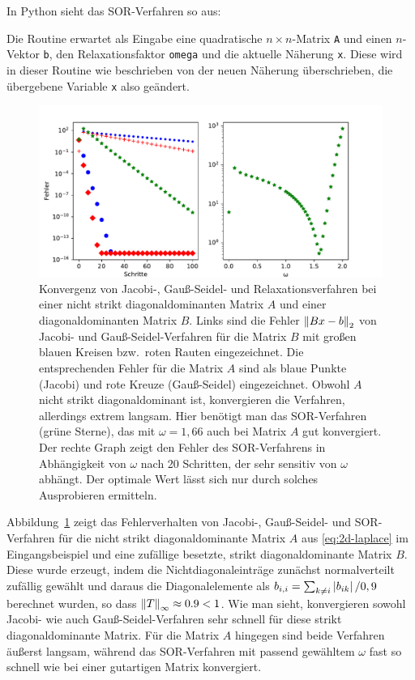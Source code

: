 In Python sieht das SOR-Verfahren so aus:

Die Routine erwartet als Eingabe eine quadratische $n\times n$-Matrix
\lstinline!A! und einen $n$-Vektor \lstinline!b!, den
Relaxationsfaktor \lstinline!omega! und die aktuelle Näherung
\lstinline!x!. Diese wird in dieser Routine wie beschrieben von der
neuen Näherung überschrieben, die übergebene Variable \lstinline!x!
also geändert.

\begin{figure}
  \centering
  \includegraphics[width=\textwidth]{plots/iterative}
  \caption{Konvergenz von Jacobi-, Gauß-Seidel- und
    Relaxationsverfahren bei einer nicht strikt diagonaldominanten Matrix $A$ und einer
    diagonaldominanten Matrix $B$. Links sind die Fehler
    $\left\lVert{Bx-b}\right\rVert_2$ von Jacobi- und Gauß-Seidel-Verfahren für die
    Matrix $B$ mit großen blauen Kreisen bzw.\, roten Rauten eingezeichnet.
    	Die entsprechenden Fehler für die Matrix $A$ sind als
    blaue Punkte (Jacobi) und rote Kreuze (Gauß-Seidel) eingezeichnet. Obwohl $A$
    nicht strikt diagonaldominant ist, konvergieren die Verfahren, allerdings extrem
    langsam. Hier benötigt man das SOR-Verfahren (grüne Sterne), das mit
    $\omega=1,66$ auch bei Matrix $A$ gut konvergiert. Der rechte Graph
    zeigt den Fehler des SOR-Verfahrens in Abhängigkeit von $\omega$
    nach 20 Schritten, der sehr sensitiv von $\omega$ abhängt. Der optimale Wert
    lässt sich nur durch solches Ausprobieren ermitteln.}
  \label{fig:sor}
\end{figure}

Abbildung~\ref{fig:sor} zeigt das Fehlerverhalten von Jacobi-,
Gauß-Seidel- und SOR-Verfahren für die nicht strikt diagonaldominante
Matrix $A$ aus \eqref{eq:2d-laplace} im Eingangsbeispiel und eine
zufällige besetzte, strikt diagonaldominante Matrix $B$. Diese wurde erzeugt,
indem die Nichtdiagonaleinträge zunächst normalverteilt zufällig gewählt
und daraus die Diagonalelemente als $b_{i,i} = \sum_{k\neq i}\left\lvert{b_{ik}}\right\rvert/0,9$ berechnet wurden, so dass $\left\lVert{T}\right\rVert_\infty \approx 0.9 < 1$. Wie man sieht, konvergieren
sowohl Jacobi- wie auch Gauß-Seidel-Verfahren sehr schnell für diese
strikt diagonaldominante Matrix. Für die Matrix $A$ hingegen sind beide
Verfahren äußerst langsam, während das SOR-Verfahren mit passend gewähltem
$\omega$ fast so schnell wie bei einer gutartigen Matrix konvergiert.

